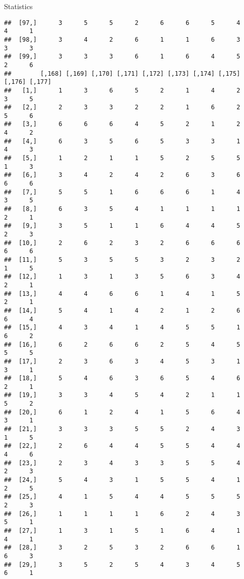 \documentclass[
  ignorenonframetext,
]{beamer}
\begin{document}
\begin{frame}[fragile]{Statistics}
\begin{verbatim}
##  [97,]      3      5      5      2      6      6      5      4      4      1
##  [98,]      3      4      2      6      1      1      6      3      3      3
##  [99,]      3      3      3      6      1      6      4      5      2      6
##        [,168] [,169] [,170] [,171] [,172] [,173] [,174] [,175] [,176] [,177]
##   [1,]      1      3      6      5      2      1      4      2      3      5
##   [2,]      2      3      3      2      2      1      6      2      5      6
##   [3,]      6      6      6      4      5      2      1      2      4      2
##   [4,]      6      3      5      6      5      3      3      1      4      3
##   [5,]      1      2      1      1      5      2      5      5      1      3
##   [6,]      3      4      2      4      2      6      3      6      6      6
##   [7,]      5      5      1      6      6      6      1      4      3      5
##   [8,]      6      3      5      4      1      1      1      1      2      1
##   [9,]      3      5      1      1      6      4      4      5      2      3
##  [10,]      2      6      2      3      2      6      6      6      6      6
##  [11,]      5      3      5      5      3      2      3      2      1      5
##  [12,]      1      3      1      3      5      6      3      4      2      1
##  [13,]      4      4      6      6      1      4      1      5      2      1
##  [14,]      5      4      1      4      2      1      2      6      6      4
##  [15,]      4      3      4      1      4      5      5      1      6      2
##  [16,]      6      2      6      6      2      5      4      5      5      5
##  [17,]      2      3      6      3      4      5      3      1      3      1
##  [18,]      5      4      6      3      6      5      4      6      2      1
##  [19,]      3      3      4      5      4      2      1      1      5      2
##  [20,]      6      1      2      4      1      5      6      4      3      1
##  [21,]      3      3      3      5      5      2      4      3      1      5
##  [22,]      2      6      4      4      5      5      4      4      4      6
##  [23,]      2      3      4      3      3      5      5      4      2      3
##  [24,]      5      4      3      1      5      5      4      1      2      5
##  [25,]      4      1      5      4      4      5      5      5      2      3
##  [26,]      1      1      1      1      6      2      4      3      5      1
##  [27,]      1      3      1      5      1      6      4      1      4      1
##  [28,]      3      2      5      3      2      6      6      1      6      3
##  [29,]      3      5      2      5      4      3      4      5      6      1

\end{verbatim}
\end{frame}
\end{document}
